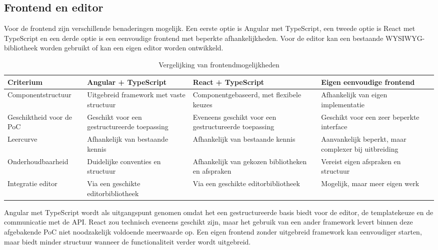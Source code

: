 \subsection{Frontend en editor}
Voor de frontend zijn verschillende benaderingen mogelijk. Een eerste optie
is Angular met TypeScript, een tweede optie is React met TypeScript en een
derde optie is een eenvoudige frontend met beperkte afhankelijkheden.
Voor de editor kan een bestaande WYSIWYG-bibliotheek worden gebruikt of
kan een eigen editor worden ontwikkeld.

\begin{table}[htbp]
    \centering
    \caption{Vergelijking van frontendmogelijkheden}
    \label{tab:frontend-vergelijking}
    \small
    \begin{tabular}{p{3.2cm}p{3.5cm}p{3.5cm}p{3.5cm}}
        \toprule
        \textbf{Criterium} &
        \textbf{Angular + TypeScript} &
        \textbf{React + TypeScript} &
        \textbf{Eigen eenvoudige frontend} \\
        \midrule
        Componentstructuur &
        Uitgebreid framework met vaste structuur &
        Componentgebaseerd, met flexibele keuzes &
        Afhankelijk van eigen implementatie \\
        \addlinespace
        Geschiktheid voor de PoC &
        Geschikt voor een gestructureerde toepassing &
        Eveneens geschikt voor een gestructureerde toepassing &
        Geschikt voor een zeer beperkte interface \\
        \addlinespace
        Leercurve &
        Afhankelijk van bestaande kennis &
        Afhankelijk van bestaande kennis &
        Aanvankelijk beperkt, maar complexer bij uitbreiding \\
        \addlinespace
        Onderhoudbaarheid &
        Duidelijke conventies en structuur &
        Afhankelijk van gekozen bibliotheken en afspraken &
        Vereist eigen afspraken en structuur \\
        \addlinespace
        Integratie editor &
        Via een geschikte editorbibliotheek &
        Via een geschikte editorbibliotheek &
        Mogelijk, maar meer eigen werk \\
        \bottomrule
    \end{tabular}
\end{table}

Angular met TypeScript wordt als uitgangspunt genomen omdat het een
gestructureerde basis biedt voor de editor, de templatekeuze en de
communicatie met de API. React zou technisch eveneens geschikt zijn, maar
het gebruik van een ander framework levert binnen deze afgebakende PoC
niet noodzakelijk voldoende meerwaarde op. Een eigen frontend zonder
uitgebreid framework kan eenvoudiger starten, maar biedt minder structuur
wanneer de functionaliteit verder wordt uitgebreid.

